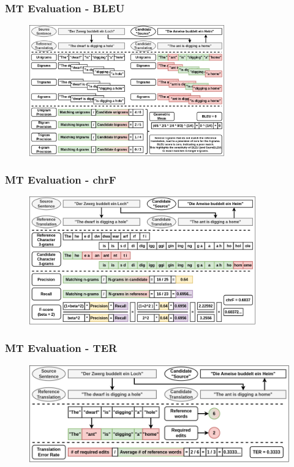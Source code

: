 \documentclass[aspectratio=169]{beamer}
\begin{document}
\begin{frame}[fragile]
	\frametitle{MT Evaluation - BLEU}
    \begin{figure}
        \centering
        \includegraphics[width=0.75\textwidth]{images/ChameleonMT-EVAL-BLEU.png}
    \end{figure}
\end{frame}

\begin{frame}[fragile]
	\frametitle{MT Evaluation - chrF}
    \begin{figure}
        \centering
        \includegraphics[width=0.87\textwidth]{images/ChameleonMT-EVAL-chrF.png}
    \end{figure}
\end{frame}

\begin{frame}[fragile]
	\frametitle{MT Evaluation - TER}
    \begin{figure}
        \centering
        \includegraphics[width=1.0\textwidth]{images/ChameleonMT-EVAL-TER.png}
    \end{figure}
\end{frame}
\end{document}
